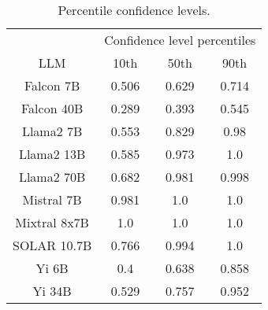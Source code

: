 \begin{table*}
\centering
\begin{tabular}{c|c|c|c}
& \multicolumn{3}{c}{Confidence level percentiles} \\ 
LLM & 10th & 50th & 90th\\ \hline
Falcon 7B & 0.506 & 0.629 & 0.714\\
Falcon 40B & 0.289 & 0.393 & 0.545\\
Llama2 7B & 0.553 & 0.829 & 0.98\\
Llama2 13B & 0.585 & 0.973 & 1.0\\
Llama2 70B & 0.682 & 0.981 & 0.998\\
Mistral 7B & 0.981 & 1.0 & 1.0\\
Mixtral 8x7B & 1.0 & 1.0 & 1.0\\
SOLAR 10.7B & 0.766 & 0.994 & 1.0\\
Yi 6B & 0.4 & 0.638 & 0.858\\
Yi 34B & 0.529 & 0.757 & 0.952\\
\hline
\end{tabular}
\caption{Percentile confidence levels.}
\label{tab:percentile_conf}
\end{table*}
